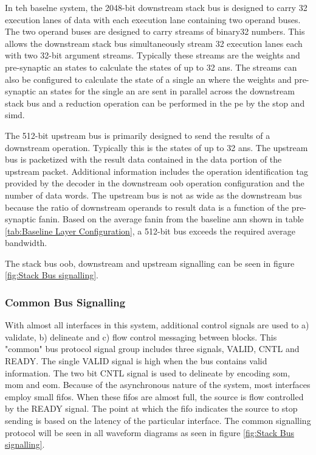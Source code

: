 In teh baselne system, the 2048-bit downstream stack bus is designed to carry 32 execution lanes of data with each execution lane containing two operand buses. 
The two operand buses are designed to carry streams of \ac{binary32} numbers.
This allows the downstream stack bus simultaneously stream 32 execution lanes each with two 32-bit argument streams. 
Typically these streams are the weights and pre-synaptic \ac{an} states to calculate the states of up to 32 \acp{an}. 
The streams can also be configured to calculate the state of a single \ac{an} where the weights and pre-synaptic \ac{an} states for the single \ac{an} are sent in parallel across the downstream stack bus and a reduction operation can be performed in the \ac{pe} by the \ac{stop} and \ac{simd}.

The 512-bit upstream bus is primarily designed to send the results of a downstream operation. Typically this is the states of up to 32 \acp{an}.
The upstream bus is packetized with the result data contained in the data portion of the upstream packet.
Additional information includes the operation identification tag provided by the decoder in the downstream \ac{oob} operation configuration and the number of data words.
The upstream bus is not as wide as the downstream bus because the ratio of downstream operands to result data is a function of the pre-synaptic fanin.
Based on the average fanin from the baseline \ac{ann} shown in table \ref{tab:Baseline Layer Configuration}, a 512-bit bus exceeds the required average bandwidth.

The stack bus \ac{oob}, downstream and upstream signalling can be seen in figure \ref{fig:Stack Bus signalling}.

\subsubsection{Common Bus Signalling}
\label{sec:Common Bus Signalling}

With almost all interfaces in this system, additional control signals are used to a) validate, b) delineate and c) flow control messaging between blocks.
This "common" bus protocol signal group includes three signals, VALID, CNTL and READY. 
The single VALID signal is high when the bus contains valid information. The two bit CNTL signal is used to delineate by encoding \ac{som}, \ac{mom} and \ac{eom}.
Because of the asynchronous nature of the system, most interfaces employ small \acp{fifo}. When these \acp{fifo} are almost full, the source is flow controlled by the READY signal. 
The point at which the \ac{fifo} indicates the source to stop sending is based on the latency of the particular interface. 
The common signalling protocol will be seen in all waveform diagrams as seen in figure \ref{fig:Stack Bus signalling}.


